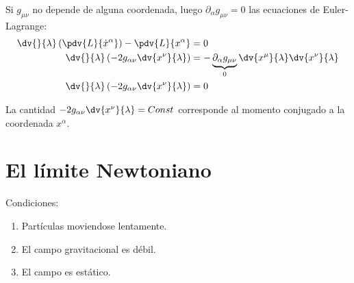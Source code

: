 \documentclass[../main]{subfiles}
\begin{document}
Si $g_{\mu\nu}$ no depende de alguna coordenada, luego $\partial_{\alpha}g_{\mu\nu}=0$ las ecuaciones de Euler-Lagrange:
\begin{equation}
    \begin{split}
        \dv{}{\lambda}\left(\pdv{L}{\dot{x}^{\alpha}}\right)-\pdv{L}{x^{\alpha}}&=0\\
        \dv{}{\lambda}\left(-2g_{\alpha\nu}\dv{x^{\nu}}{\lambda}\right)&=-\underbrace{\partial_{\alpha}g_{\mu\nu}}_{0} \dv{x^{\mu}}{\lambda}\dv{x^{\nu}}{\lambda}\\
        \dv{}{\lambda}\left(-2g_{\alpha\nu}\dv{x^{\nu}}{\lambda}\right)&=0
    \end{split}
\end{equation}

La cantidad $-2g_{\alpha\nu}\dv{x^{\nu}}{\lambda}=Const$ corresponde al momento conjugado a la coordenada $x^{\alpha}$.

\section{El límite Newtoniano}

Condiciones:
\begin{enumerate}
    \item Partículas moviendose lentamente.
    \item El campo gravitacional es débil.
    \item El campo es estático.
\end{enumerate}
\end{document}
